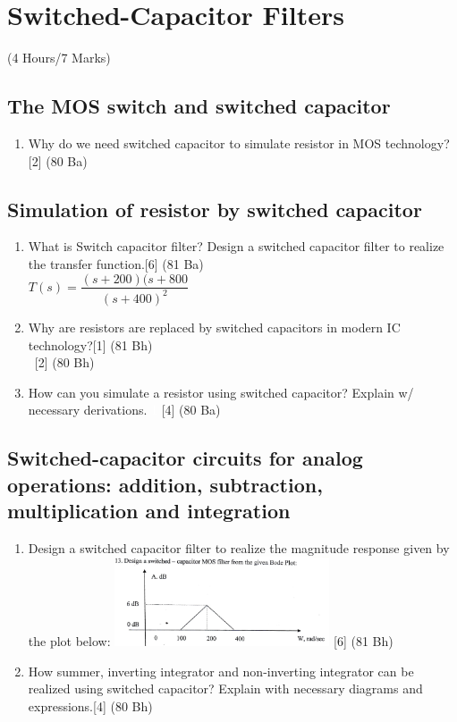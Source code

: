 \documentclass[12pt]{article}
\newcommand{\enter}{\\\textcolor{white}{1}}
\begin{document}
\pagebreak
\section{Switched-Capacitor Filters}
\begin{center}(4 Hours/7 Marks)\end{center}
\subsection{The MOS switch and switched capacitor}
\begin{enumerate}
\item Why do we need switched capacitor to simulate resistor in MOS technology?\hfill[2] (80 Ba)
\end{enumerate}
\subsection{Simulation of resistor by switched capacitor}
\begin{enumerate}
\item What is Switch capacitor filter? Design a switched capacitor filter to realize the transfer function.\hfill [6] (81 Ba)\\
$T(s) = \dfrac{(s+200)(s+800}{(s+400)^2}$
\item Why are resistors are replaced by switched capacitors in modern IC technology?\hfill[1] (81 Bh)
\enter\hfill [2] (80 Bh)
\item How can you simulate a resistor using switched capacitor? Explain w/ necessary derivations.
\textcolor{white}{1} \hfill[4] (80 Ba)

\end{enumerate}
\subsection{Switched-capacitor circuits for analog operations: addition, subtraction, multiplication and integration}
\begin{enumerate}
\item Design a switched capacitor filter to realize the magnitude response given by the plot below:
\includegraphics[width=0.5\textwidth]{fd_1} \hfill [6] (81 Bh)
\item How summer, inverting integrator and non-inverting integrator can be realized using switched capacitor? Explain with necessary diagrams and expressions.\hfill [4] (80 Bh)
\end{enumerate}
\end{document}
